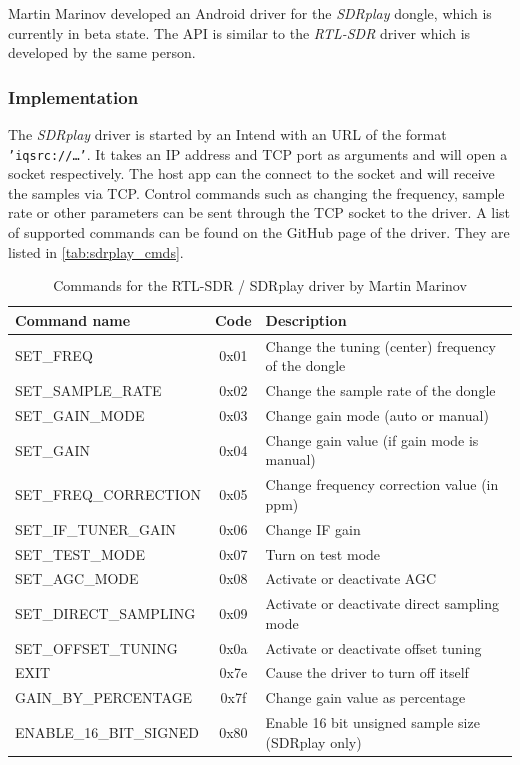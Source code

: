 Martin Marinov developed an Android driver for the \emph{SDRplay} dongle, which
is currently in beta state. The API is similar to the \emph{RTL-SDR} driver which is
developed by the same person.

\subsubsection{Implementation}

The \emph{SDRplay} driver is started by an Intend with an URL of the format
\texttt{'iqsrc://\ldots'}. It takes an IP address and TCP port as arguments and
will open a socket respectively. The host app can the connect to the socket and
will receive the samples via TCP. Control commands such as changing the
frequency, sample rate or other parameters can be sent through the TCP socket
to the driver. A list of supported commands can be found on the GitHub page
of the driver. They are listed in \autoref{tab:sdrplay_cmds}.


\begin{table}
	\begin{center}
		\begin{tabular}{l c l}
			Command name & Code & Description \\\hline
			SET\_FREQ & 0x01 & Change the tuning (center) frequency of the dongle \\
			SET\_SAMPLE\_RATE & 0x02 & Change the sample rate of the dongle \\
			SET\_GAIN\_MODE & 0x03 & Change gain mode (auto or manual) \\
			SET\_GAIN & 0x04 & Change gain value (if gain mode is manual) \\
			SET\_FREQ\_CORRECTION & 0x05 & Change frequency correction value (in ppm) \\
			SET\_IF\_TUNER\_GAIN & 0x06 & Change \ac{IF} gain \\
			SET\_TEST\_MODE & 0x07 & Turn on test mode \\
			SET\_AGC\_MODE & 0x08 & Activate or deactivate \ac{AGC} \\
			SET\_DIRECT\_SAMPLING & 0x09 & Activate or deactivate direct sampling mode \\
			SET\_OFFSET\_TUNING & 0x0a & Activate or deactivate offset tuning \\
			EXIT & 0x7e & Cause the driver to turn off itself \\
			GAIN\_BY\_PERCENTAGE & 0x7f & Change gain value as percentage \\
			ENABLE\_16\_BIT\_SIGNED & 0x80 & Enable 16 bit unsigned sample size (SDRplay only) \\\hline
		\end{tabular}
		\caption{Commands for the RTL-SDR / SDRplay driver by Martin Marinov}
		\label{tab:sdrplay_cmds}
	\end{center}
\end{table}



